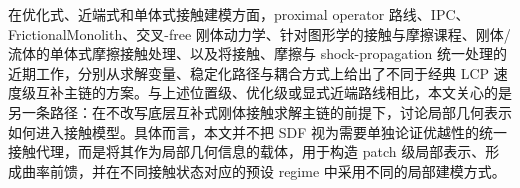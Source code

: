 在优化式、近端式和单体式接触建模方面，proximal operator 路线、IPC、FrictionalMonolith、交叉-free 刚体动力学、针对图形学的接触与摩擦课程、刚体/流体的单体式摩擦接触处理、以及将接触、摩擦与 shock-propagation 统一处理的近期工作，分别从求解变量、稳定化路径与耦合方式上给出了不同于经典 LCP 速度级互补主链的方案\cite{proximalcontact2017,li2020ipc,frictionalmonolith2021,contactgraphicscourse2021,intersectionfree2021,sphcontact2023,unifiedshock2023,chen2024primaldual}。与上述位置级、优化级或显式近端路线相比，本文关心的是另一条路径：在不改写底层互补式刚体接触求解主链的前提下，讨论局部几何表示如何进入接触模型。具体而言，本文并不把 SDF 视为需要单独论证优越性的统一接触代理，而是将其作为局部几何信息的载体，用于构造 patch 级局部表示、形成曲率前馈，并在不同接触状态对应的预设 regime 中采用不同的局部建模方式。
